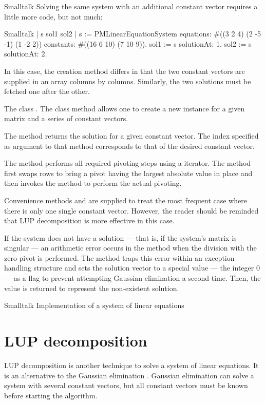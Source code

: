 \begin{displaycode}{Smalltalk}
Solving the same system with an additional constant vector
requires a little more code, but not much:
\begin{displaycode}{Smalltalk}
 | s sol1 sol2 |
 s := PMLinearEquationSystem equations: #((3 2 4) (2 -5 -1) (1 -2 2))
                        constants: #((16 6 10)
                                     (7 10 9)).
 sol1 := s solutionAt: 1.
 sol2 := s solutionAt: 2.
\end{displaycode}
In this case, the creation method differs in that the two constant
vectors are supplied in an array columns by columns. Similarly,
the two solutions must be fetched one after the other.

The class .
The class method  allows one to create a new instance for a given
matrix and a series of constant vectors.

The method  returns the solution for a given
constant vector. The index specified as argument to that method
corresponds to that of the desired constant vector.


The method  performs all required pivoting steps using
a  iterator. The method  first swaps
rows to bring a pivot having the largest absolute value in place
and then invokes the method  to perform the actual
pivoting.

Convenience methods  and 
are supplied to treat the most frequent case where there is only
one single constant vector. However, the reader should be reminded
that LUP decomposition is more effective in this case.

If the system does not have a solution --- that is, if the
system's matrix is singular --- an arithmetic error occurs in the
method  when the division with the zero pivot is
performed. The method  traps this error within an
exception handling structure and sets the solution vector to a
special value --- the integer 0 --- as a flag to prevent
attempting Gaussian elimination a second time. Then, the value
 is returned to represent the non-existent solution.

\begin{listing}[label=lst:lineqs]{Smalltalk}
{Implementation of a system of linear equations}
%
\end{listing}

\section{LUP decomposition}
\label{sec:lup} LUP decomposition is another technique to solve a
system of linear equations. It is an alternative to the Gaussian
elimination \cite{CorLeiRiv}. Gaussian elimination can solve a
system with several constant vectors, but all constant vectors
must be known before starting the algorithm.


\end{displaycode}
